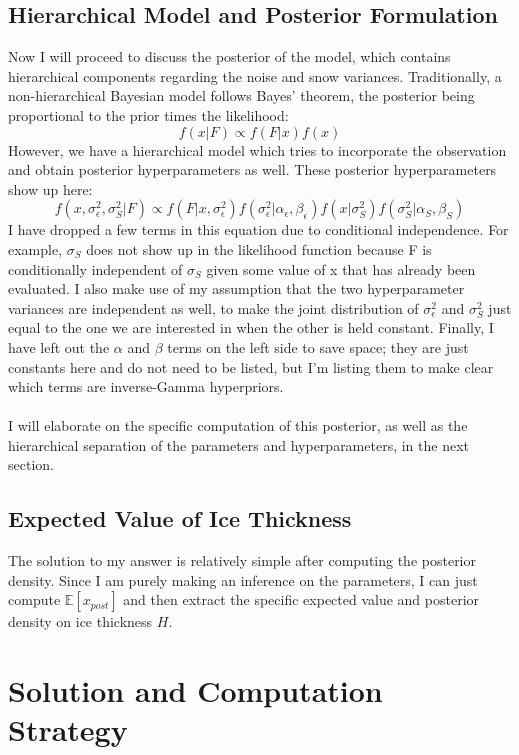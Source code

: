 \documentclass[12pt, letterpaper]{article}
\begin{document}
\subsection{Hierarchical Model and Posterior Formulation}
Now I will proceed to discuss the posterior of the model, which contains hierarchical components regarding the noise and snow variances.
Traditionally, a non-hierarchical Bayesian model follows Bayes' theorem, the posterior being proportional to the prior times the likelihood:
\[
    f(x | F) \propto f(F | x) f(x)
\]
However, we have a hierarchical model which tries to incorporate the observation and obtain posterior hyperparameters as well.
These posterior hyperparameters show up here:
\[
    f(x, \sigma^2_\epsilon, \sigma^2_S | F) \propto f(F | x, \sigma^2_\epsilon) f(\sigma^2_\epsilon | \alpha_\epsilon, \beta_\epsilon)
    f(x | \sigma^2_S) f(\sigma^2_S | \alpha_S, \beta_S)
\]
I have dropped a few terms in this equation due to conditional independence. For example, $\sigma_S$ does not show up
in the likelihood function because F is conditionally independent of $\sigma_S$ given some value of x that has already been evaluated.
I also make use of my assumption that the two hyperparameter variances are independent as well, to make the joint distribution of
$\sigma^2_\epsilon$ and $\sigma^2_S$ just equal to the one we are interested in when the other is held constant.
Finally, I have left out the $\alpha$ and $\beta$ terms on the left side to save space; they are just constants here
and do not need to be listed, but I'm listing them to make clear which terms are inverse-Gamma hyperpriors.
\\\\
I will elaborate on the specific computation of this posterior, as well as the hierarchical separation of the parameters and hyperparameters,
in the next section.

\subsection{Expected Value of Ice Thickness}
The solution to my answer is relatively simple after computing the posterior density. Since I am purely making an inference on the parameters,
I can just compute $\mathbb{E}[x_{post}]$ and then extract the specific expected value and posterior density on ice thickness $H$.

\newpage
\section{Solution and Computation Strategy}
\end{document}
